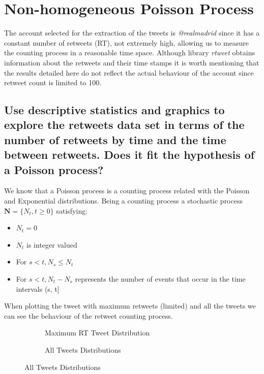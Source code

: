
\section{Non-homogeneous Poisson Process}

The account selected for the extraction of the tweets is \textit{@realmadrid} since it has a constant number of retweets (RT), not extremely high, allowing us to measure the counting process in a reasonable time space. 
Although library \textit{rtweet} obtains information about the retweets and their time stamps it is worth mentioning that the results detailed here do not reflect the actual behaviour of the account since retweet count is limited to 100.

\subsection{Use descriptive statistics and graphics to explore the retweets data set in terms of the number of retweets by time and the time between retweets. Does it fit the hypothesis of a Poisson process?}

We know that a Poisson process is a counting process related with the Poisson and Exponential distributions. 
Being a counting process a stochastic process $\mathbf{N} = \{ N_t, t \geq 0 \}$ satisfying:
\begin{itemize}
	\item $N_t=0$
	\item $N_t$ is integer valued
	\item For $s<t, N_s \leq N_t$
	\item For $s<t, N_t - N_s$ represents the number of events that occur in the time intervals (s, t]
\end{itemize}

When plotting the tweet with maximum retweets (limited) and all the tweets we can see the behaviour of the retweet counting process.

\begin{figure}[H]
	\centering
	\begin{subfigure}{.5\textwidth}
	  \centering
	  
	  \caption{Maximum RT Tweet Distribution}
	  \label{fig:rtMax}
	\end{subfigure}%
	\begin{subfigure}{.5\textwidth}
	  \centering
	  \vspace*{-3em}
	  
	  \vspace*{-1.4em}
	  \caption{All Tweets Distributions}
	  \label{fig:rtAll}
	\end{subfigure}
\end{figure}


